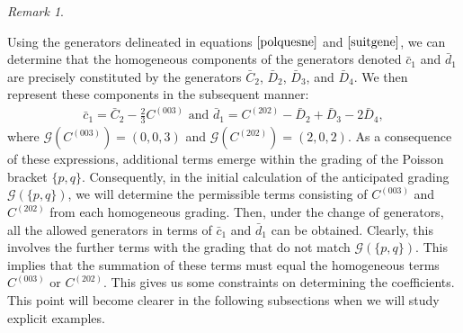 \documentclass[10pt]{amsart}
\theoremstyle{definition}
\theoremstyle{corollary}
\theoremstyle{remark}
\newtheorem{remark}[theorem]{Remark}
\theoremstyle{conclusion}
\begin{document}
\begin{remark}
\label{regrad}
    
Using the generators delineated in equations $\eqref{polquesne}$ and $\eqref{suitgene}$, we can determine that the homogeneous components of the generators denoted $\bar{c}_1$ and $\bar{d}_1$ are precisely constituted by the generators $\bar{C}_2$, $\bar{D}_2$, $\bar{D}_3$, and $\bar{D}_4$. We then represent these components in the subsequent manner: \begin{align} 
 \bar{c}_1 =  \bar{C}_2 - \frac{2}{3}C^{(003)}  \text{ and } \bar{d}_1 = C^{(202)} - \bar{D}_2 + \bar{D}_3 - 2\bar{D}_4, \label{eq:changeba1}
 \end{align} where $\mathcal{G} \left(C^{(003)} \right)=(0,0,3)$ and $\mathcal{G} \left(C^{(202)}\right)=(2,0,2)$. As a consequence of these expressions, additional terms emerge within the grading of the Poisson bracket $\{p,q\}$. Consequently, in the initial calculation of the anticipated grading $\mathcal{G}(\{p,q\})$, we will determine the permissible terms consisting of $C^{(003)}$ and $C^{(202)}$ from each homogeneous grading. Then, under the change of generators, all the allowed generators in terms of $\bar{c}_1$ and $\bar{d}_1$ can be obtained. Clearly, this involves the further terms with the grading that do not match $\mathcal{G} (\{p,q\}).$ This implies that the summation of these terms must equal the homogeneous terms $C^{(003)}$ or $C^{(202)}$. This gives us some constraints on determining the coefficients.  This point will become clearer in the following subsections when we will study explicit examples. 
\end{remark}
\end{document}
